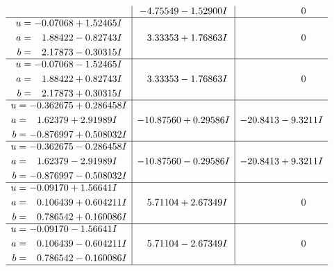 \documentclass[1p]{elsarticle_modified}
\theoremstyle{definition}
\begin{document}
$$\begin{array}{c|c|c}
 & -4.75549 - 1.52900 I & \phantom{-0.000000 } 0 \\ \hline\begin{aligned}
u &= -0.07068 + 1.52465 I \\
a &= \phantom{-}1.88422 - 0.82743 I \\
b &= \phantom{-}2.17873 - 0.30315 I\end{aligned}
 & \phantom{-}3.33353 + 1.76863 I & \phantom{-0.000000 } 0 \\ \hline\begin{aligned}
u &= -0.07068 - 1.52465 I \\
a &= \phantom{-}1.88422 + 0.82743 I \\
b &= \phantom{-}2.17873 + 0.30315 I\end{aligned}
 & \phantom{-}3.33353 - 1.76863 I & \phantom{-0.000000 } 0 \\ \hline\begin{aligned}
u &= -0.362675 + 0.286458 I \\
a &= \phantom{-}1.62379 + 2.91989 I \\
b &= -0.876997 + 0.508032 I\end{aligned}
 & -10.87560 + 0.29586 I & -20.8413 - 9.3211 I \\ \hline\begin{aligned}
u &= -0.362675 - 0.286458 I \\
a &= \phantom{-}1.62379 - 2.91989 I \\
b &= -0.876997 - 0.508032 I\end{aligned}
 & -10.87560 - 0.29586 I & -20.8413 + 9.3211 I \\ \hline\begin{aligned}
u &= -0.09170 + 1.56641 I \\
a &= \phantom{-}0.106439 + 0.604211 I \\
b &= \phantom{-}0.786542 + 0.160086 I\end{aligned}
 & \phantom{-}5.71104 + 2.67349 I & \phantom{-0.000000 } 0 \\ \hline\begin{aligned}
u &= -0.09170 - 1.56641 I \\
a &= \phantom{-}0.106439 - 0.604211 I \\
b &= \phantom{-}0.786542 - 0.160086 I\end{aligned}
 & \phantom{-}5.71104 - 2.67349 I & \phantom{-0.000000 } 0\\
 \hline 
 \end{array}$$\newpage$$\begin{array}{c|c|c}  

\end{array}$$
\end{document}
